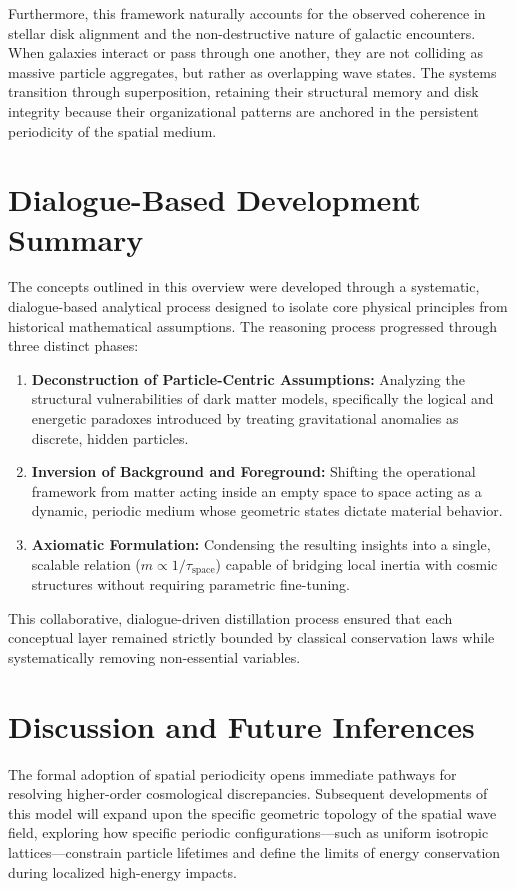 \documentclass[12pt]{article}
\begin{document}
Furthermore, this framework naturally accounts for the observed coherence in stellar disk alignment and the non-destructive nature of galactic encounters. When galaxies interact or pass through one another, they are not colliding as massive particle aggregates, but rather as overlapping wave states. The systems transition through superposition, retaining their structural memory and disk integrity because their organizational patterns are anchored in the persistent periodicity of the spatial medium.

\section{Dialogue-Based Development Summary}

The concepts outlined in this overview were developed through a systematic, dialogue-based analytical process designed to isolate core physical principles from historical mathematical assumptions. The reasoning process progressed through three distinct phases:

\begin{enumerate}
    \item \textbf{Deconstruction of Particle-Centric Assumptions:} Analyzing the structural vulnerabilities of dark matter models, specifically the logical and energetic paradoxes introduced by treating gravitational anomalies as discrete, hidden particles.
    \item \textbf{Inversion of Background and Foreground:} Shifting the operational framework from matter acting inside an empty space to space acting as a dynamic, periodic medium whose geometric states dictate material behavior.
    \item \textbf{Axiomatic Formulation:} Condensing the resulting insights into a single, scalable relation (\( m \propto 1/\tau_{\text{space}} \)) capable of bridging local inertia with cosmic structures without requiring parametric fine-tuning.
\end{enumerate}

This collaborative, dialogue-driven distillation process ensured that each conceptual layer remained strictly bounded by classical conservation laws while systematically removing non-essential variables.

\section{Discussion and Future Inferences}

The formal adoption of spatial periodicity opens immediate pathways for resolving higher-order cosmological discrepancies. Subsequent developments of this model will expand upon the specific geometric topology of the spatial wave field, exploring how specific periodic configurations—such as uniform isotropic lattices—constrain particle lifetimes and define the limits of energy conservation during localized high-energy impacts.
\end{document}
